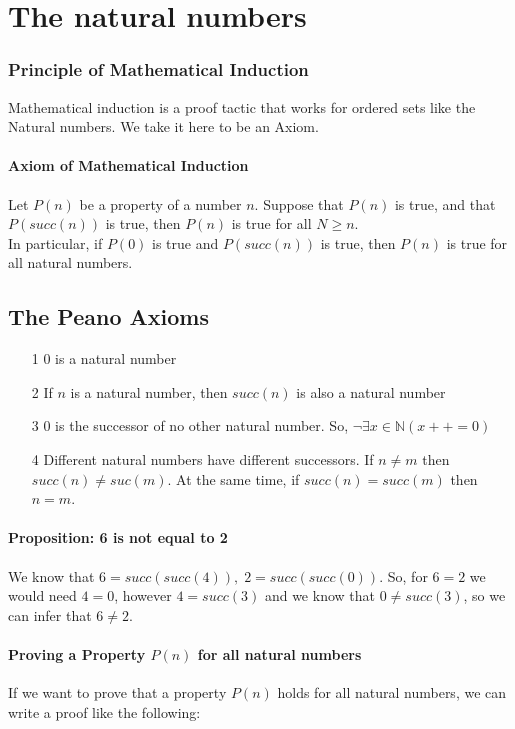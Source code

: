 
\chapter{The natural numbers}

\subsection*{Principle of Mathematical Induction}
Mathematical induction is a proof tactic that works for ordered sets like the Natural numbers. We take it here to be an Axiom.

\subsubsection*{Axiom of Mathematical Induction}
Let $P(n)$ be a property of a number $n$. Suppose that $P(n)$ is true, and that $P(succ(n))$ is true, then $P(n)$ is true for all $N \geqslant n$.\\
In particular, if $P(0)$ is true and $P(succ(n))$ is true, then $P(n)$ is true for all natural numbers.


\section{The Peano Axioms}

\begin{itemize}
	\item[1] 0 is a natural number
	\item[2] If $n$ is a natural number, then $succ(n)$ is also a natural number
	\item[3] 0 is the successor of no other natural number. So, $\neg\exists x\in\mathbb{N}(x++ = 0)$
	\item[4] Different natural numbers have different successors. If $n \neq m$ then $succ(n) \neq suc(m)$. At the same time, if $succ(n) = succ(m)$ then $n = m$. 
\end{itemize}


\subsubsection*{Proposition: 6 is not equal to 2}
We know that $6 = succ(succ(4)),\; 2 = succ(succ(0)).$ So, for $ 6 = 2$ we would need $4 = 0$, however $4 = succ(3)$ and we know that $0 \neq succ(3)$, so we can infer that $6 \neq 2$.

\subsubsection*{Proving a Property $P(n)$ for all natural numbers}
If we want to prove that a property $P(n)$ holds for all natural numbers, we can write a proof like the following:


